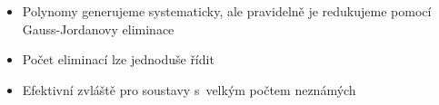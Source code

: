 \documentclass[cmpiitalkstyle, 25pt]{cmptalk}
\begin{document}
\begin{cmptalkslide}
  \begin{itemize}
    \item Polynomy generujeme systematicky, ale pravidelně je redukujeme pomocí Gauss-Jordanovy eliminace
    \item Počet eliminací lze jednoduše řídit
    \item Efektivní zvláště pro soustavy s~velkým počtem neznámých
  \end{itemize}


\end{cmptalkslide}
\end{document}
